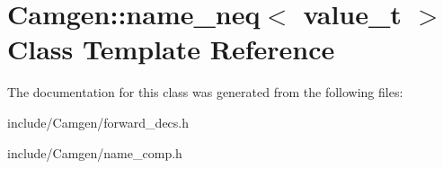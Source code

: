 \hypertarget{a00379}{\section{Camgen\-:\-:name\-\_\-neq$<$ value\-\_\-t $>$ Class Template Reference}
\label{a00379}
}


The documentation for this class was generated from the following files\-:\begin{DoxyCompactItemize}
\item 
include/\-Camgen/forward\-\_\-decs.\-h\item 
include/\-Camgen/name\-\_\-comp.\-h\end{DoxyCompactItemize}
